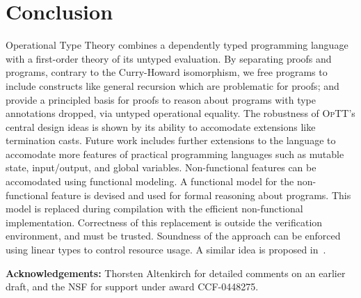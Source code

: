 \documentclass{fundam}
\newcommand{\optt}{\textsc{OpTT}}
\begin{document}
\section{Conclusion}

Operational Type Theory combines a dependently typed programming
language with a first-order theory of its untyped evaluation.  By
separating proofs and programs, contrary to the Curry-Howard
isomorphism, we free programs to include constructs like general
recursion which are problematic for proofs; and provide a principled
basis for proofs to reason about programs with type annotations
dropped, via untyped operational equality.  The robustness of \optt's
central design ideas is shown by its ability to accomodate extensions
like termination casts.  Future work includes further extensions to
the language to accomodate more features of practical programming
languages such as mutable state, input/output, and global variables.
Non-functional features can be accomodated using functional modeling.
A functional model for the non-functional feature is devised and used
for formal reasoning about programs.  This model is replaced during
compilation with the efficient non-functional implementation.
Correctness of this replacement is outside the verification
environment, and must be trusted.  Soundness of the approach can be
enforced using linear types to control resource usage.  A similar idea
is proposed in~\cite{swierstra+07}.

\textbf{Acknowledgements:} Thorsten Altenkirch for detailed comments
on an earlier draft, and the NSF for support under award CCF-0448275.



\nocite{HG91}

\end{document}
